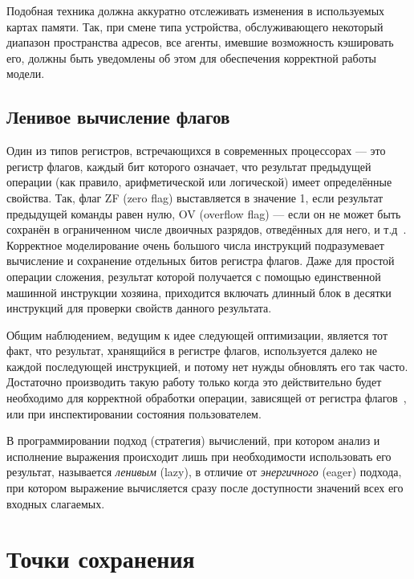 Подобная техника должна аккуратно отслеживать изменения в используемых картах памяти. Так, при смене типа устройства, обслуживающего некоторый диапазон пространства адресов, все агенты, имевшие возможность кэшировать его, должны быть уведомлены об этом для обеспечения корректной работы модели.

\subsection{Ленивое вычисление флагов}

Один из типов регистров, встречающихся в современных процессорах --- это регистр флагов, каждый бит которого означает, что результат предыдущей операции (как правило, арифметической или логической) имеет определённые свойства. Так, флаг ZF (\abbr zero flag) выставляется в значение 1, если результат предыдущей команды равен нулю, OV (\abbr overflow flag) --- если он не может быть сохранён в ограниченном числе двоичных разрядов, отведённых для него, и т.д~\cite{intelmanual1}. Корректное моделирование очень большого числа инструкций подразумевает вычисление и сохранение отдельных битов регистра флагов. Даже для простой операции сложения, результат которой получается с помощью единственной машинной инструкции хозяина, приходится включать длинный блок в десятки инструкций для проверки свойств данного результата.

Общим наблюдением, ведущим к идее следующей оптимизации, является тот факт, что результат, хранящийся в регистре флагов, используется далеко не каждой последующей инструкцией, и потому нет нужды обновлять его так часто. Достаточно производить такую работу только когда это действительно будет необходимо для корректной обработки операции, зависящей от регистра флагов~\cite{bochs}, или при инспектировании состояния пользователем. 

\begin{digression}
В программировании подход (стратегия) вычислений, при котором анализ и исполнение выражения происходит лишь при необходимости использовать его результат, называется \textit{ленивым} (\abbr lazy), в отличие от \textit{энергичного} (\abbr eager) подхода, при котором выражение вычисляется сразу после доступности значений всех его входных слагаемых. %
\end{digression}

\section{Точки сохранения}

